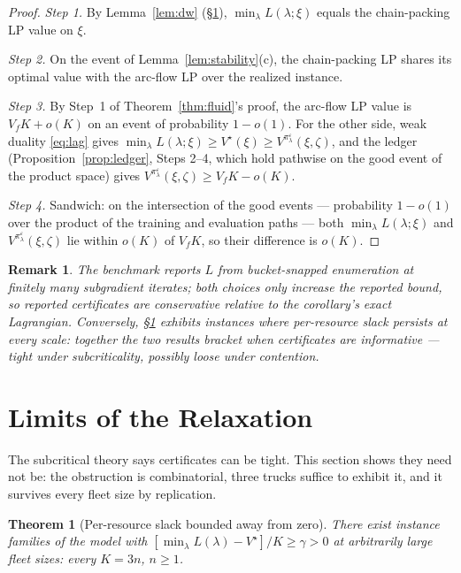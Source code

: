 \documentclass[11pt]{article}
\newtheorem{theorem}{Theorem}
\newtheorem{remark}{Remark}
\newcommand{\Vstar}{V^{\star}}
\newcommand{\pol}{\pi_{\lambda}}
\begin{document}
\begin{proof}
\emph{Step 1.} By Lemma~\ref{lem:dw} (\S\ref{sec:limits}),
$\min_{\lambda} L(\lambda; \xi)$ equals the chain-packing LP value on
$\xi$.

\emph{Step 2.} On the event of Lemma~\ref{lem:stability}(c), the
chain-packing LP shares its optimal value with the arc-flow LP over
the realized instance.

\emph{Step 3.} By Step~1 of Theorem~\ref{thm:fluid}'s proof, the
arc-flow LP value is $V_f K + o(K)$ on an event of probability
$1 - o(1)$. For the other side, weak duality \eqref{eq:lag} gives
$\min_{\lambda} L(\lambda; \xi) \geq \Vstar(\xi) \geq
V^{\pol^{\varepsilon}}(\xi, \zeta)$, and the ledger
(Proposition~\ref{prop:ledger}, Steps 2--4, which hold pathwise on the
good event of the product space) gives
$V^{\pol^{\varepsilon}}(\xi, \zeta) \geq V_f K - o(K)$.

\emph{Step 4.} Sandwich: on the intersection of the good events ---
probability $1 - o(1)$ over the product of the training and
evaluation paths --- both $\min_{\lambda} L(\lambda; \xi)$ and
$V^{\pol^{\varepsilon}}(\xi, \zeta)$ lie within $o(K)$ of $V_f K$, so
their difference is $o(K)$.
\end{proof}

\begin{remark}
The benchmark reports $L$ from bucket-snapped enumeration at finitely
many subgradient iterates; both choices only \emph{increase} the
reported bound, so reported certificates are conservative relative to
the corollary's exact Lagrangian. Conversely, \S\ref{sec:limits}
exhibits instances where per-resource slack persists at every scale:
together the two results bracket when certificates are informative ---
tight under subcriticality, possibly loose under contention.
\end{remark}

\section{Limits of the Relaxation}
\label{sec:limits}

The subcritical theory says certificates can be tight. This section
shows they need not be: the obstruction is combinatorial, three
trucks suffice to exhibit it, and it survives every fleet size by
replication.

\begin{theorem}[Per-resource slack bounded away from zero]
\label{thm:kernel}
There exist instance families of the model with
$[\min_{\lambda} L(\lambda) - \Vstar] / K \geq \gamma > 0$ at
arbitrarily large fleet sizes: every $K = 3n$, $n \geq 1$.
\end{theorem}
\end{document}
